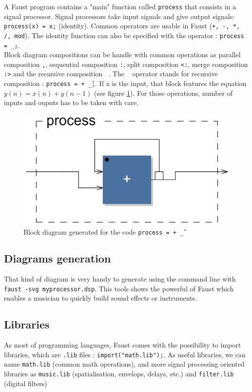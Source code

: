 \documentclass[11pt,a4paper]{article}
\begin{document}
A Faust program contains a "main" function called \texttt{process} that consists in a signal processor.
Signal processors take input signals and give output signals: \texttt{process(x) = x;} (identity). Common operators are usable in Faust (\texttt{+, -, *, /, mod}). The identity function can also be specified with the operator : \texttt{process = \_;}.\\
Block diagram compositions can be handle with common operations as parallel composition \texttt{,}, sequential composition \texttt{:}, split composition \texttt{<:}, merge composition \texttt{:>} and the recursive composition \texttt{~}. The \texttt{~} operator stands for recursive composition : \texttt{process = + \~ \_;}. If x is the input, that block features the equation $y(n) = x(n) + y(n-1)$ (see figure \ref{fig:recursive}).
For those operations, number of inputs and ouputs has to be taken with care.
\begin{figure}[h]
	\centering
	\includegraphics[scale=0.2]{pictures/recursive.png}
	\caption{Block diagram generated for the code \texttt{process = + \~ \_}}
	\label{fig:recursive}
\end{figure}

\subsection*{Diagrams generation}
That kind of diagram is very handy to generate using the command line with \texttt{faust -svg myprocessor.dsp}. This tools shows the powerful of Faust which enables a musician to quickly build sound effects or instruments.

\subsection*{Libraries}
As most of programming languages, Faust comes with the possibility to import libraries, which are \texttt{.lib} files : \texttt{import("math.lib");}. As useful libraries, we can name \texttt{math.lib} (common math operations), and more signal processing oriented libraries as \texttt{music.lib} (spatialisation, envelops, delays, etc.) and \texttt{filter.lib} (digital filters) \cite{filters}
\end{document}
